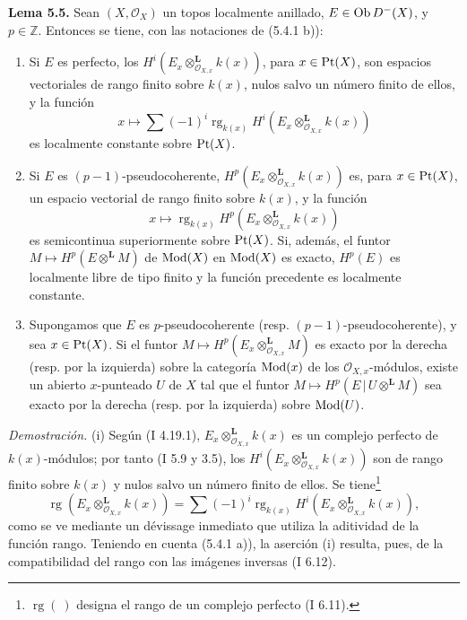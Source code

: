 \textbf{Lema 5.5.} Sean \((X,\mathcal O_X)\) un topos localmente anillado, \(E\in\operatorname{Ob} D^{-}(X)\), y \(p\in\mathbb Z\). Entonces se tiene, con las notaciones de (5.4.1 b)):
\begin{enumerate}[label=(\roman*)]
\item Si \(E\) es perfecto, los \(H^i(E_x\otimes_{\mathcal O_{X,x}}^{\mathbf L}k(x))\), para \(x\in\operatorname{Pt}(X)\), son espacios vectoriales de rango finito sobre \(k(x)\), nulos salvo un número finito de ellos, y la función
\[
 x\longmapsto\sum(-1)^i\operatorname{rg}_{k(x)}H^i(E_x\otimes_{\mathcal O_{X,x}}^{\mathbf L}k(x))
\]
es localmente constante sobre \(\operatorname{Pt}(X)\).
\item Si \(E\) es \((p-1)\)-pseudocoherente, \(H^p(E_x\otimes_{\mathcal O_{X,x}}^{\mathbf L}k(x))\) es, para \(x\in\operatorname{Pt}(X)\), un espacio vectorial de rango finito sobre \(k(x)\), y la función
\[
 x\longmapsto\operatorname{rg}_{k(x)}H^p(E_x\otimes_{\mathcal O_{X,x}}^{\mathbf L}k(x))
\]
es semicontinua superiormente sobre \(\operatorname{Pt}(X)\). Si, además, el funtor \(M\mapsto H^p(E\otimes^{\mathbf L}M)\) de \(\operatorname{Mod}(X)\) en \(\operatorname{Mod}(X)\) es exacto, \(H^p(E)\) es localmente libre de tipo finito y la función precedente es localmente constante.
\item Supongamos que \(E\) es \(p\)-pseudocoherente (resp. \((p-1)\)-pseudocoherente), y sea \(x\in\operatorname{Pt}(X)\). Si el funtor \(M\mapsto H^p(E_x\otimes_{\mathcal O_{X,x}}^{\mathbf L}M)\) es exacto por la derecha (resp. por la izquierda) sobre la categoría \(\operatorname{Mod}(x)\) de los \(\mathcal O_{X,x}\)-módulos, existe un abierto \(x\)-punteado \(U\) de \(X\) tal que el funtor \(M\mapsto H^p(E\,|\,U\otimes^{\mathbf L}M)\) sea exacto por la derecha (resp. por la izquierda) sobre \(\operatorname{Mod}(U)\).
\end{enumerate}

\emph{Demostración.} (i) Según (I 4.19.1), \(E_x\otimes_{\mathcal O_{X,x}}^{\mathbf L}k(x)\) es un complejo perfecto de \(k(x)\)-módulos; por tanto (I 5.9 y 3.5), los \(H^i(E_x\otimes_{\mathcal O_{X,x}}^{\mathbf L}k(x))\) son de rango finito sobre \(k(x)\) y nulos salvo un número finito de ellos. Se tiene\footnote{\(\operatorname{rg}(\ )\) designa el rango de un complejo perfecto (I 6.11).}
\begin{equation}
 \operatorname{rg}(E_x\otimes_{\mathcal O_{X,x}}^{\mathbf L}k(x))=\sum(-1)^i\operatorname{rg}_{k(x)}H^i(E_x\otimes_{\mathcal O_{X,x}}^{\mathbf L}k(x)),\tag{5.5.1}
\end{equation}
como se ve mediante un dévissage inmediato que utiliza la aditividad de la función rango. Teniendo en cuenta (5.4.1 a)), la aserción (i) resulta, pues, de la compatibilidad del rango con las imágenes inversas (I 6.12).

